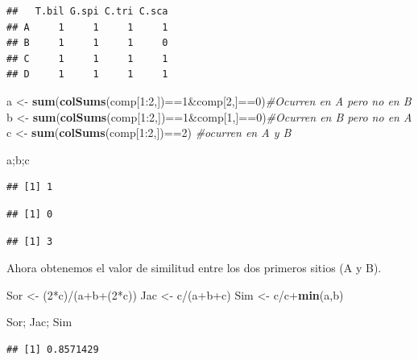 \documentclass[]{book}
\newenvironment{Shaded}{\begin{snugshade}}{\end{snugshade}}
\newcommand{\KeywordTok}[1]{\textcolor[rgb]{0.13,0.29,0.53}{\textbf{{#1}}}}
\newcommand{\DecValTok}[1]{\textcolor[rgb]{0.00,0.00,0.81}{{#1}}}
\newcommand{\StringTok}[1]{\textcolor[rgb]{0.31,0.60,0.02}{{#1}}}
\newcommand{\CommentTok}[1]{\textcolor[rgb]{0.56,0.35,0.01}{\textit{{#1}}}}
\newcommand{\NormalTok}[1]{{#1}}
\begin{document}
\begin{verbatim}
##   T.bil G.spi C.tri C.sca
## A     1     1     1     1
## B     1     1     1     0
## C     1     1     1     1
## D     1     1     1     1
\end{verbatim}

\begin{Shaded}
\begin{Highlighting}[]
\NormalTok{a <-}\StringTok{ }\KeywordTok{sum}\NormalTok{(}\KeywordTok{colSums}\NormalTok{(comp[}\DecValTok{1}\NormalTok{:}\DecValTok{2}\NormalTok{,])==}\DecValTok{1}\NormalTok{&comp[}\DecValTok{2}\NormalTok{,]==}\DecValTok{0}\NormalTok{)}\CommentTok{#Ocurren en A pero no en B}
\NormalTok{b <-}\StringTok{ }\KeywordTok{sum}\NormalTok{(}\KeywordTok{colSums}\NormalTok{(comp[}\DecValTok{1}\NormalTok{:}\DecValTok{2}\NormalTok{,])==}\DecValTok{1}\NormalTok{&comp[}\DecValTok{1}\NormalTok{,]==}\DecValTok{0}\NormalTok{)}\CommentTok{#Ocurren en B pero no en A}
\NormalTok{c <-}\StringTok{ }\KeywordTok{sum}\NormalTok{(}\KeywordTok{colSums}\NormalTok{(comp[}\DecValTok{1}\NormalTok{:}\DecValTok{2}\NormalTok{,])==}\DecValTok{2}\NormalTok{) }\CommentTok{#ocurren en A y B}

\NormalTok{a;b;c}
\end{Highlighting}
\end{Shaded}

\begin{verbatim}
## [1] 1
\end{verbatim}

\begin{verbatim}
## [1] 0
\end{verbatim}

\begin{verbatim}
## [1] 3
\end{verbatim}

Ahora obtenemos el valor de similitud entre los dos primeros sitios (A y
B).

\begin{Shaded}
\begin{Highlighting}[]
\NormalTok{Sor <-}\StringTok{ }\NormalTok{(}\DecValTok{2}\NormalTok{*c)/(a+b+(}\DecValTok{2}\NormalTok{*c))}
\NormalTok{Jac <-}\StringTok{ }\NormalTok{c/(a+b+c)}
\NormalTok{Sim <-}\StringTok{ }\NormalTok{c/c+}\KeywordTok{min}\NormalTok{(a,b)}

\NormalTok{Sor; Jac; Sim}
\end{Highlighting}
\end{Shaded}

\begin{verbatim}
## [1] 0.8571429
\end{verbatim}
\end{document}
